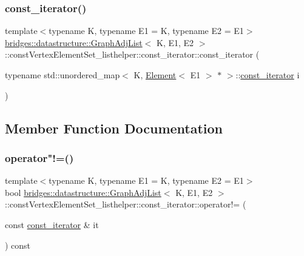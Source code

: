 \subsubsection{\texorpdfstring{const\+\_\+iterator()}{const\_iterator()}}
{\footnotesize\ttfamily template$<$typename K, typename E1 = K, typename E2 = E1$>$ \\
\mbox{\hyperlink{classbridges_1_1datastructure_1_1_graph_adj_list}{bridges\+::datastructure\+::\+Graph\+Adj\+List}}$<$ K, E1, E2 $>$\+::const\+Vertex\+Element\+Set\+\_\+listhelper\+::const\+\_\+iterator\+::const\+\_\+iterator (\begin{DoxyParamCaption}\item[{typename std\+::unordered\+\_\+map$<$ K, \mbox{\hyperlink{classbridges_1_1datastructure_1_1_element}{Element}}$<$ E1 $>$ $\ast$ $>$\+::\mbox{\hyperlink{classbridges_1_1datastructure_1_1_graph_adj_list_1_1const_vertex_element_set__listhelper_1_1const__iterator}{const\+\_\+iterator}}}]{i }\end{DoxyParamCaption})\hspace{0.3cm}{\ttfamily [inline]}}



\subsection{Member Function Documentation}
\mbox{\label{classbridges_1_1datastructure_1_1_graph_adj_list_1_1const_vertex_element_set__listhelper_1_1const__iterator_ac30d7d7e8eb8a976f7dd193bc7cb7b1c}} 
\subsubsection{\texorpdfstring{operator"!=()}{operator!=()}}
{\footnotesize\ttfamily template$<$typename K, typename E1 = K, typename E2 = E1$>$ \\
bool \mbox{\hyperlink{classbridges_1_1datastructure_1_1_graph_adj_list}{bridges\+::datastructure\+::\+Graph\+Adj\+List}}$<$ K, E1, E2 $>$\+::const\+Vertex\+Element\+Set\+\_\+listhelper\+::const\+\_\+iterator\+::operator!= (\begin{DoxyParamCaption}\item[{const \mbox{\hyperlink{classbridges_1_1datastructure_1_1_graph_adj_list_1_1const_vertex_element_set__listhelper_1_1const__iterator}{const\+\_\+iterator}} \&}]{it }\end{DoxyParamCaption}) const\hspace{0.3cm}{\ttfamily [inline]}}

